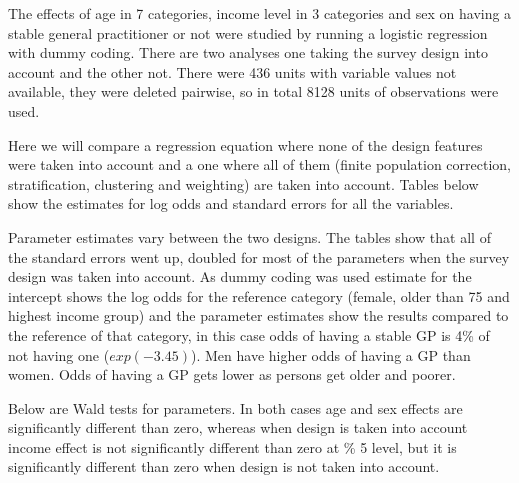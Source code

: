 The effects of age in 7 categories, income level in 3 categories and sex on having a stable general practitioner or not were studied by running a logistic regression with dummy coding. There are two analyses one taking the survey design into account and the other not. There were 436 units with variable values not available, they were deleted pairwise, so in total 8128 units of observations were used.

Here we will compare a regression equation where none of the design features were taken into account and a one where all of them (finite population correction, stratification, clustering and weighting) are taken into account. Tables below show the estimates for log odds and standard errors for all the variables.





Parameter estimates vary between the two designs. The tables show that all of the standard errors went up, doubled for most of the parameters when the survey design was taken into account. As dummy coding was used estimate for the intercept shows the log odds for the reference category (female, older than 75 and highest income group) and the parameter estimates show the results compared to the reference of that category, in this case odds of having a stable GP is 4\% of not having one ($exp(-3.45)$). Men have higher odds of having a GP than women. Odds of having a GP gets lower as persons get older and poorer.

Below are Wald tests for parameters. In both cases age and sex effects are significantly different than zero, whereas when design is taken into account income effect is not significantly different than zero at \% 5 level, but it is significantly different than zero when design is not taken into account. 




